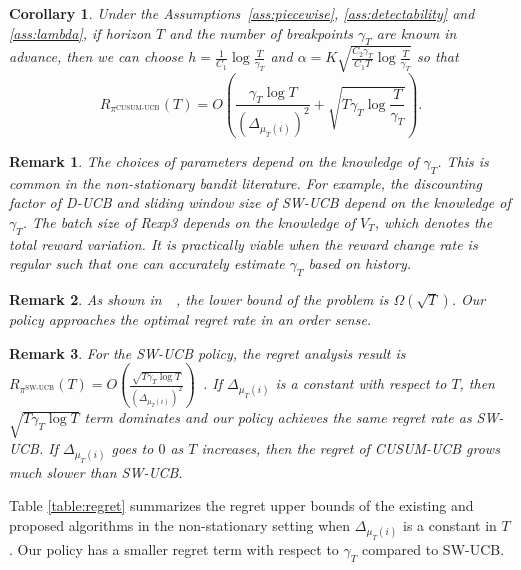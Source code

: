 \documentclass[letterpaper]{article} %
\newtheorem{corollary}{Corollary}
\newtheorem{remark}{Remark}
\newcommand{\green}{}
\begin{document}
\begin{corollary}\label{cor:regret}
Under the Assumptions~\ref{ass:piecewise}, \ref{ass:detectability} and \ref{ass:lambda},
if horizon $T$ and the number of breakpoints $\gamma_T$ are known in advance, then we can choose $h=\frac{1}{C_1}\log \frac{T}{\gamma_T}$ and $\alpha=K\sqrt{\frac{C_2\gamma_T}{C_1T}\log\frac{T}{\gamma_T}}$ so that
\begin{equation}
R_{\pi^{\text{CUSUM-UCB}}}(T)=O\left(\frac{\gamma_T\log T}{(\Delta_{\mu_T(i)})^2}+\sqrt{T\gamma_T\log\frac{T}{\gamma_T}}\right).
\end{equation}
\end{corollary}
{\green
\begin{remark}
The choices of parameters depend on the knowledge of $\gamma_T$. This is common in the non-stationary bandit literature. For example, the discounting factor of D-UCB and sliding window size of SW-UCB depend on the knowledge of $\gamma_T$. The batch size of Rexp3 depends on the knowledge of $V_T$, which denotes the total reward variation. It is practically viable when the reward change rate is regular such that one can accurately estimate $\gamma_T$ based on history.
\end{remark}
}
\begin{remark}
As shown in~\citeauthor{garivier2008upper}~, the lower bound of the problem
is $\Omega(\sqrt{T})$. Our policy approaches the optimal regret rate
in an order sense.
\end{remark}
\begin{remark}\label{rmk:delta}
For the SW-UCB policy, the regret analysis result is $R_{\pi^{\text{SW-UCB}}}(T)=O\left(\frac{\sqrt{T\gamma_T\log T}}{(\Delta_{\mu_T(i)})^2}\right)$~\cite{garivier2008upper}. If $\Delta_{\mu_T(i)}$ is a constant with respect to $T$, then $\sqrt{T\gamma_T\log T}$ term dominates and our policy achieves the same regret rate as SW-UCB. If $\Delta_{\mu_T(i)}$ goes to $0$ as $T$ increases, then the regret of CUSUM-UCB grows much slower than SW-UCB.
\end{remark}

Table \ref{table:regret} summarizes the regret upper bounds
of the existing and proposed algorithms in the non-stationary setting
when $\Delta_{\mu_T(i)}$ is a constant in $T$. Our policy has a smaller regret term with respect to $\gamma_T$ compared to SW-UCB.
\end{document}
